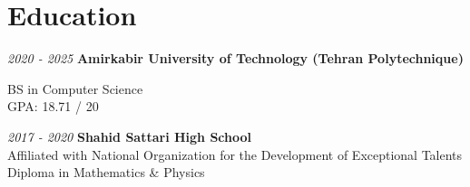 
\section{Education}




\begin{twocolentry}{\textit{2020 - 2025}}
	\textbf{Amirkabir University of Technology (Tehran Polytechnique)}
	
	BS in Computer Science
	\\
	GPA: 18.71 / 20
\end{twocolentry}

\vspace{0.1cm}
\begin{twocolentry}{\textit{2017 - 2020}}
	\textbf{Shahid Sattari High School}
	\\
	Affiliated with National Organization for the Development of Exceptional Talents
	Diploma in Mathematics \& Physics
	
\end{twocolentry}

